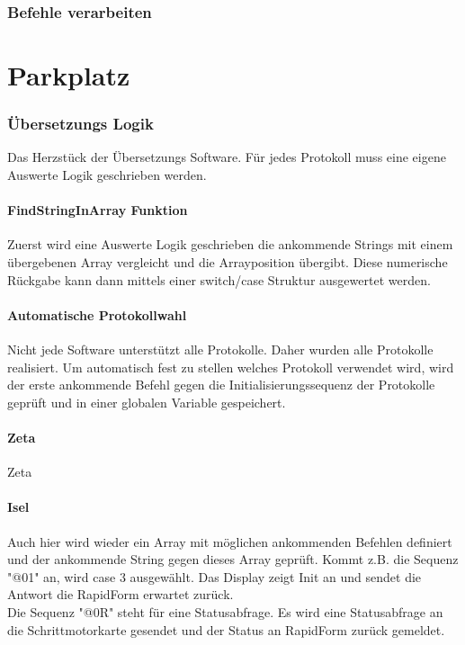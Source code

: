\lstset{language=Java, basicstyle=\footnotesize, showstringspaces=false, tabsize=8}


\subsection{Befehle verarbeiten}


\chapter{Parkplatz}

\subsection{Übersetzungs Logik}
Das Herzstück der Übersetzungs Software. Für jedes Protokoll muss eine eigene Auswerte Logik geschrieben werden. 
\subsubsection{FindStringInArray Funktion}
Zuerst wird eine Auswerte Logik geschrieben die ankommende Strings mit einem übergebenen Array vergleicht und die Arrayposition übergibt. Diese numerische Rückgabe kann dann mittels einer switch/case Struktur ausgewertet werden.
\lstset{language=C, basicstyle=\footnotesize, showstringspaces=false, tabsize=8}

\subsubsection{Automatische Protokollwahl}
Nicht jede Software unterstützt alle Protokolle. Daher wurden alle Protokolle realisiert. Um automatisch fest zu stellen welches Protokoll verwendet wird, wird der erste ankommende Befehl gegen die Initialisierungssequenz der Protokolle geprüft und in einer globalen Variable gespeichert.
\lstset{language=C, basicstyle=\footnotesize, showstringspaces=false, tabsize=8}

\subsubsection{Zeta}
Zeta
\subsubsection{Isel}
Auch hier wird wieder ein Array mit möglichen ankommenden Befehlen definiert und der ankommende String gegen dieses Array geprüft. Kommt z.B. die Sequenz "@01" an, wird case 3 ausgewählt. Das Display zeigt Init an und sendet die Antwort die RapidForm erwartet zurück.\\
Die Sequenz "@0R" steht für eine Statusabfrage. Es wird eine Statusabfrage an die Schrittmotorkarte gesendet und der Status an RapidForm zurück gemeldet.
\lstset{language=C, basicstyle=\footnotesize, showstringspaces=false, tabsize=8}

